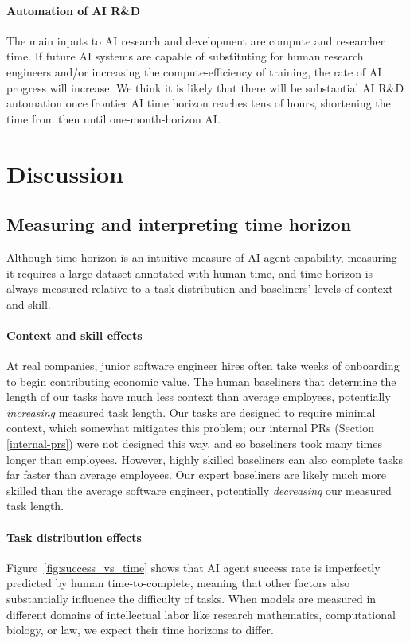 \documentclass{article}
\begin{document}
\paragraph{Automation of AI R\&D} The main inputs to AI research and development are compute and researcher time. If future AI systems are capable of substituting for human research engineers and/or increasing the compute-efficiency of training, the rate of AI progress will increase. We think it is likely that there will be substantial AI R\&D automation once frontier AI time horizon reaches tens of hours, shortening the time from then until one-month-horizon AI.

\section{Discussion} \label{sec:discussion}


\subsection{Measuring and interpreting time horizon} \label{sec:interpretation_horizon}

Although time horizon is an intuitive measure of AI agent capability, measuring it requires a large dataset annotated with human time, and time horizon is always measured relative to a task distribution and baseliners' levels of context and skill.

\paragraph{Context and skill effects}

At real companies, junior software engineer hires often take weeks of onboarding to begin contributing economic value. The human baseliners that determine the length of our tasks have much less context than average employees, potentially \textit{increasing} measured task length. Our tasks are designed to require minimal context, which somewhat mitigates this problem; our internal PRs (Section \ref{internal-prs}) were not designed this way, and so baseliners took many times longer than employees. However, highly skilled baseliners can also complete tasks far faster than average employees. Our expert baseliners are likely much more skilled than the average software engineer, potentially \textit{decreasing} our measured task length.

\paragraph{Task distribution effects} Figure~\ref{fig:success_vs_time} shows that AI agent success rate is imperfectly predicted by human time-to-complete, meaning that other factors also substantially influence the difficulty of tasks. When models are measured in different domains of intellectual labor like research mathematics, computational biology, or law, we expect their time horizons to differ.
\end{document}
